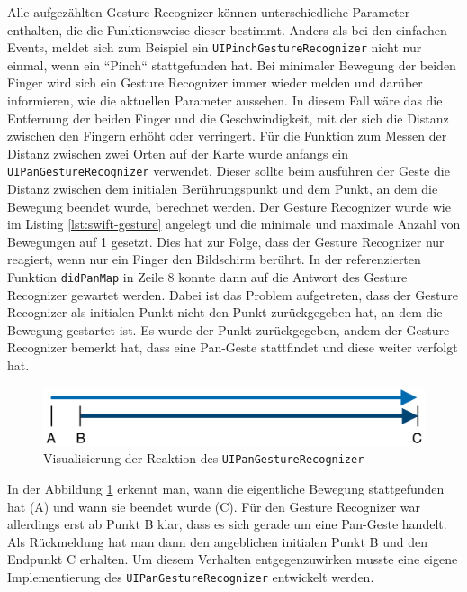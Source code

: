 Alle aufgezählten Gesture Recognizer können unterschiedliche Parameter enthalten, die die Funktionsweise dieser bestimmt.
Anders als bei den einfachen Events, meldet sich zum Beispiel ein \texttt{UIPinchGestureRecognizer} nicht nur einmal, wenn ein ``Pinch`` stattgefunden hat.
Bei minimaler Bewegung der beiden Finger wird sich ein Gesture Recognizer immer wieder melden und darüber informieren, wie die aktuellen Parameter aussehen.
In diesem Fall wäre das die Entfernung der beiden Finger und die Geschwindigkeit, mit der sich die Distanz zwischen den Fingern erhöht oder verringert.\pbreak%
%
Für die Funktion zum Messen der Distanz zwischen zwei Orten auf der Karte wurde anfangs ein \texttt{UIPanGestureRecognizer} verwendet.
Dieser sollte beim ausführen der Geste die Distanz zwischen dem initialen Berührungspunkt und dem Punkt, an dem die Bewegung beendet wurde, berechnet werden.
Der Gesture Recognizer wurde wie im Listing \ref{lst:swift-gesture} angelegt und die minimale und maximale Anzahl von Bewegungen auf 1 gesetzt.
Dies hat zur Folge, dass der Gesture Recognizer nur reagiert, wenn nur ein Finger den Bildschirm berührt.
In der referenzierten Funktion \texttt{didPanMap} in Zeile 8 konnte dann auf die Antwort des Gesture Recognizer gewartet werden.\pbreak%
%
Dabei ist das Problem aufgetreten, dass der Gesture Recognizer als initialen Punkt nicht den Punkt zurückgegeben hat, an dem die Bewegung gestartet ist.
Es wurde der Punkt zurückgegeben, andem der Gesture Recognizer bemerkt hat, dass eine Pan-Geste stattfindet und diese weiter verfolgt hat.
\begin{figure}[h]
	\centering
	\includegraphics[scale=0.25]{images/pangesture.png}
	\caption{Visualisierung der Reaktion des \texttt{UIPanGestureRecognizer}}
	\label{fig:pangesture}
\end{figure}
In der Abbildung \ref{fig:pangesture} erkennt man, wann die eigentliche Bewegung stattgefunden hat (A) und wann sie beendet wurde (C).
Für den Gesture Recognizer war allerdings erst ab Punkt B klar, dass es sich gerade um eine Pan-Geste handelt.
Als Rückmeldung hat man dann den angeblichen initialen Punkt B und den Endpunkt C erhalten.
Um diesem Verhalten entgegenzuwirken musste eine eigene Implementierung des \texttt{UIPanGestureRecognizer} entwickelt werden.
